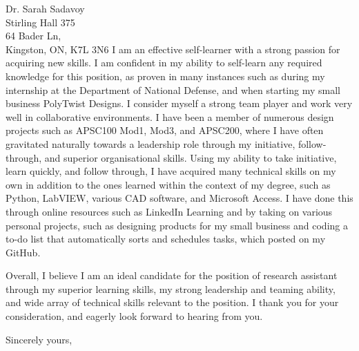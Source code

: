 \documentclass[11pt]{letter} %
\begin{document}
\begin{letter}{Dr. Sarah Sadavoy \\
Stirling Hall 375 \\
64 Bader Ln, \\
Kingston, ON, K7L 3N6}
I am an effective self-learner with a strong passion for acquiring new skills. I am confident in my ability to self-learn any required knowledge for this position, as proven in many instances such as during my internship at the Department of National Defense, and when starting my small business PolyTwist Designs. I consider myself a strong team player and work very well in collaborative environments. I have been a member of numerous design projects such as APSC100 Mod1, Mod3, and APSC200, where I have often gravitated naturally towards a leadership role through my initiative, follow-through, and superior organisational skills. Using my ability to take initiative, learn quickly, and follow through, I have acquired many technical skills on my own in addition to the ones learned within the context of my degree, such as Python, LabVIEW, various CAD software, and Microsoft Access. I have done this through online resources such as LinkedIn Learning and by taking on various personal projects, such as designing products for my small business and coding a to-do list that automatically sorts and schedules tasks, which posted on my GitHub.

Overall, I believe I am an ideal candidate for the position of research assistant through my superior learning skills, my strong leadership and teaming ability, and wide array of technical skills relevant to the position. I thank you for your consideration, and eagerly look forward to hearing from you.

\closing{Sincerely yours,}


\end{letter}
\end{document}
